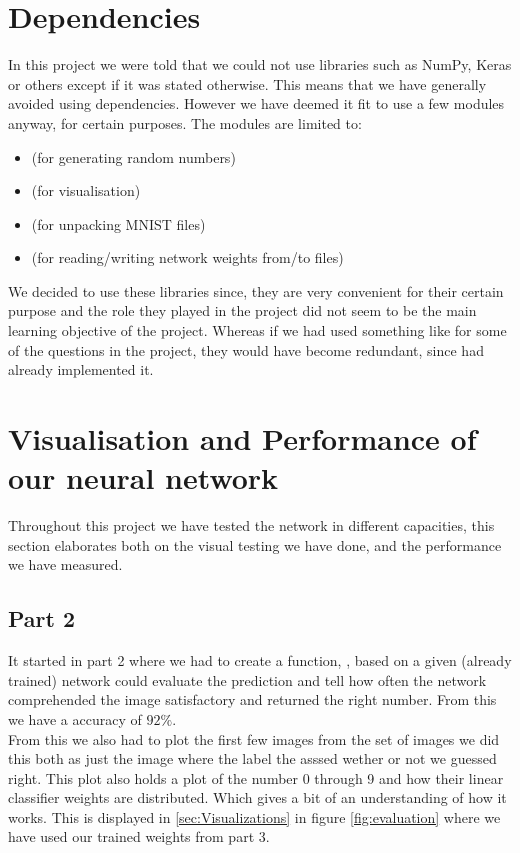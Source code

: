 \documentclass[a4paper,oneside,article,english]{memoir}
\begin{document}
\section{Dependencies}  
\label{sec:dependencies}
In this project we were told that we could not use libraries such as NumPy,
Keras or others except if it was stated otherwise. This means that we have
generally avoided using dependencies. However we have deemed it fit to use a few
modules anyway, for certain purposes. The modules are limited to: 
\begin{itemize}
  \item
    \href{https://docs.python.org/3/library/random.html}{\underline{}}
    (for generating random numbers)
  \item \href{https://matplotlib.org}{\underline{}} (for
    visualisation)
  \item
    \href{https://docs.python.org/3/library/gzip.html}{\underline{}}
    (for unpacking MNIST  files)
  \item
    \href{https://docs.python.org/3/library/json.html}{\underline{}}
    (for reading/writing network weights from/to files)
\end{itemize}
We decided to use these libraries since, they are very convenient for their certain purpose and the role they played in the project did not seem to be the main learning objective of the project. Whereas if we had used something like
\href{https://numpy.org}{\underline{}} for some
of the questions in the project, they would have become redundant, since
 had already implemented it.


\section{Visualisation and Performance of our neural network}  
\label{sec:visualisation and performance}
Throughout this project we have tested the network in different capacities, this
section elaborates both on the visual testing we have done, and the performance
we have measured.
\subsection{Part 2}
It started in part 2 where we had to create a function, , based on a given (already trained) network could evaluate the prediction and tell how often the network comprehended the image satisfactory and returned the right number. From this we have a accuracy of $92\%$.\\
From this we also had to plot the first few images from the set of images we did
this both as just the image where the label the asssed wether or not we guessed
right. This plot also holds a plot of the number 0 through 9 and how their
linear classifier weights are distributed. Which gives a bit of an understanding
of how it works. This is displayed in \ref{sec:Visualizations} in figure
\ref{fig:evaluation} where we have used our trained weights from part 3.
\end{document}
